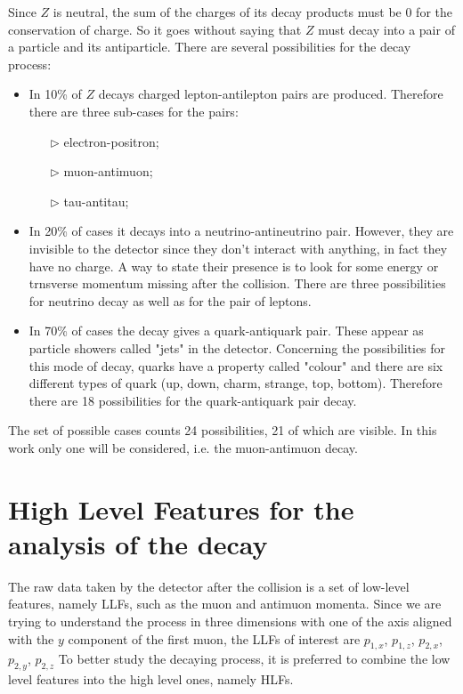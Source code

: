 Since $Z$ is neutral, the sum of the charges of its decay products must be 0 for the conservation of charge. So it goes without saying that $Z$ must decay into a pair of a particle and its antiparticle. There are several possibilities for the decay process:
\begin{itemize}
	\item In 10\% of $Z$ decays charged lepton-antilepton pairs are produced. Therefore there are three sub-cases for the pairs:
	\begin{itemize}
		\item[$\triangleright$] electron-positron;
		\item[$\triangleright$] muon-antimuon;
		\item[$\triangleright$] tau-antitau;
	\end{itemize}
	
	\item In 20\% of cases it decays into a neutrino-antineutrino pair. However, they are invisible to the detector since they don't interact with anything, in fact they have no charge. A way to state their presence is to look for some energy or trnsverse momentum missing after the collision. There are three possibilities for neutrino decay as well as for the pair of leptons.
	
	\item In 70\% of cases the decay gives a quark-antiquark pair. These appear as particle showers called "jets" in the detector. Concerning the possibilities for this mode of decay, quarks have a property called "colour" and there are six different types of quark (up, down, charm, strange, top, bottom). Therefore there are 18 possibilities for the quark-antiquark pair decay.
\end{itemize}

The set of possible cases counts 24 possibilities, 21 of which are visible. In this work only one will be considered, i.e. the muon-antimuon decay.





\section{High Level Features for the analysis of the decay}
The raw data taken by the detector after the collision is a set of low-level features, namely LLFs, such as the muon and antimuon momenta. Since we are trying to understand the process in three dimensions with one of the axis aligned with the $y$ component of the first muon, the LLFs of interest are $p_{1,x}$, $p_{1,z}$, $p_{2,x}$, $p_{2,y}$, $p_{2,z}$
To better study the decaying process, it is preferred to combine the low level features into the high level ones, namely HLFs.

